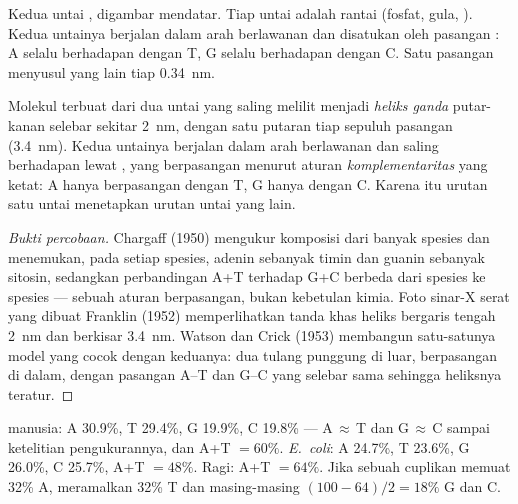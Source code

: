 \begin{omfigure}
{\small Kedua untai , digambar mendatar. Tiap untai adalah rantai
 (fosfat, gula, ). Kedua untainya berjalan dalam arah
berlawanan dan disatukan oleh pasangan : A selalu berhadapan dengan
T, G selalu berhadapan dengan C. Satu pasangan  menyusul yang lain
tiap \qty{0.34}{nm}.}
\end{omfigure}

\begin{proposition}\label{prop:g10:universal-dna:helix}
Molekul  terbuat dari dua untai yang saling melilit menjadi
\emph{heliks ganda} putar-kanan selebar sekitar
\qty{2}{nm}, dengan satu putaran tiap sepuluh pasangan 
(\qty{3.4}{nm}). Kedua untainya berjalan dalam arah berlawanan dan
saling berhadapan lewat , yang berpasangan menurut aturan
\emph{komplementaritas} yang ketat: A hanya
berpasangan dengan T, G hanya dengan C. Karena itu urutan satu untai
menetapkan urutan untai yang lain.
\end{proposition}
\begin{proof}[Bukti percobaan]
Chargaff (1950) mengukur komposisi   dari banyak spesies dan
menemukan, pada setiap spesies, adenin sebanyak timin dan guanin
sebanyak sitosin, sedangkan perbandingan A+T terhadap G+C berbeda dari
spesies ke spesies --- sebuah aturan berpasangan, bukan kebetulan
kimia. Foto sinar-X serat  yang dibuat Franklin (1952)
memperlihatkan tanda khas heliks bergaris tengah \qty{2}{nm} dan
berkisar \qty{3.4}{nm}. Watson dan Crick (1953) membangun satu-satunya
model yang cocok dengan keduanya: dua tulang punggung di luar, 
berpasangan di dalam, dengan pasangan A--T dan G--C yang selebar sama
sehingga heliksnya teratur.
\end{proof}

\begin{example}\label{ex:g10:universal-dna:chargaff}
 manusia: A 30.9\%, T 29.4\%, G 19.9\%, C 19.8\% --- A$\,\approx\,$T
dan G$\,\approx\,$C sampai ketelitian pengukurannya, dan
A+T $= 60\%$. \emph{E.~coli}: A 24.7\%, T 23.6\%, G 26.0\%, C 25.7\%,
A+T $= 48\%$. Ragi: A+T $= 64\%$. Jika sebuah cuplikan  memuat 32\%
A,  meramalkan 32\% T dan masing-masing $(100 - 64)/2 = 18\%$
G dan C.
\end{example}

